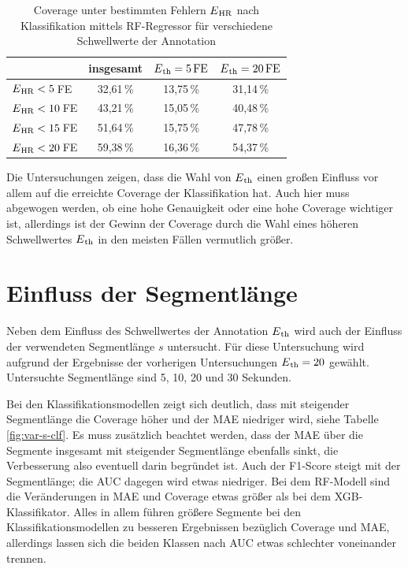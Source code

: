 \begin{table}[H]
	\centering
  	\begin{tabular}{l || c | c | c}
 											& insgesamt 		& $E\textsubscript{th}= 5\text{\,}\si{FE}$ & $E\textsubscript{th}= 20\text{\,}\si{FE}$\\\hline
 		$E\textsubscript{HR} < 5$\,\si{FE} 	&  32{,}61\,\% 	& 13,75\,\% 			& 31,14\,\%\\
 		$E\textsubscript{HR} < 10$\,\si{FE} 	&  43{,}21\,\% 	& 15,05\,\% 			& 40,48\,\%\\
 		$E\textsubscript{HR} < 15$\,\si{FE} 	&  51{,}64\,\% 	& 15,75\,\% 			& 47,78\,\%\\
 		$E\textsubscript{HR} < 20$\,\si{FE} 	&  59{,}38\,\% 	& 16,36\,\% 			& 54,37\,\%\\
 	\end{tabular}
 	\caption{Coverage unter bestimmten Fehlern $E\textsubscript{HR}$ nach Klassifikation mittels \ac{RF}-Regressor für verschiedene Schwellwerte der Annotation}
 	\label{fig:rf-regr-cov-eth}
\end{table}

Die Untersuchungen zeigen, dass die Wahl von $E\textsubscript{th}$ einen großen Einfluss vor allem auf die erreichte Coverage der Klassifikation hat. Auch hier muss abgewogen werden, ob eine hohe Genauigkeit oder eine hohe Coverage wichtiger ist, allerdings ist der Gewinn der Coverage durch die Wahl eines höheren Schwellwertes $E\textsubscript{th}$ in den meisten Fällen vermutlich größer.

\section{Einfluss der Segmentlänge}

Neben dem Einfluss des Schwellwertes der Annotation $E\textsubscript{th}$ wird auch der Einfluss der verwendeten Segmentlänge $s$ untersucht. Für diese Untersuchung wird aufgrund der Ergebnisse der vorherigen Untersuchungen $E\textsubscript{th}=20$ gewählt. Untersuchte Segmentlänge sind 5, 10, 20 und 30 Sekunden.

Bei den Klassifikationsmodellen zeigt sich deutlich, dass mit steigender Segmentlänge die Coverage höher und der \ac{MAE} niedriger wird, siehe Tabelle\,\ref{fig:var-s-clf}. Es muss zusätzlich beachtet werden, dass der \ac{MAE} über die Segmente insgesamt mit steigender Segmentlänge ebenfalls sinkt, die Verbesserung also eventuell darin begründet ist. Auch der F1-Score steigt mit der Segmentlänge; die \ac{AUC} dagegen wird etwas niedriger. Bei dem \ac{RF}-Modell sind die Veränderungen in \ac{MAE} und Coverage etwas größer als bei dem \ac{XGB}-Klassifikator. Alles in allem führen größere Segmente bei den Klassifikationsmodellen zu besseren Ergebnissen bezüglich Coverage und \ac{MAE}, allerdings lassen sich die beiden Klassen nach \ac{AUC} etwas schlechter voneinander trennen. 

